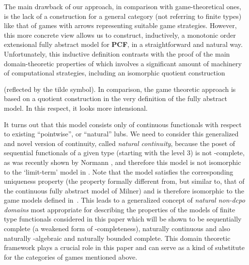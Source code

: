 \documentclass[fleqn]{LMCS}
\theoremstyle{plain}\newtheorem{satz}[thm]{Satz}
\theoremstyle{plain}\newtheorem{hyp}[thm]{Hypothesis}
\theoremstyle{plain}\newtheorem{hyps}[thm]{Hypotheses}
\theoremstyle{definition}\newtheorem{note}[thm]{Note}
\newcommand{\PCF}{\mbox{\bf PCF}}
\newcommand{\?}{\mbox{?}}
\begin{document}
The main drawback of our approach, in comparison with 
game-theoretical ones, 
is the lack of a construction 
for a general category (not referring to finite types) 
like that of games with arrows representing suitable game strategies. However, 
this more concrete view allows 
us to construct, inductively, 
a monotonic order extensional fully abstract model for \PCF,  
in a straightforward and natural way. 
Unfortunately, this inductive definition contrasts with the 
proof of the main domain-theoretic properties of  
which involves a significant amount of machinery 
of computational strategies, 
including an isomorphic quotient construction 
 
(reflected by the tilde symbol). 
In comparison, the game theoretic approach is based on a quotient 
construction in the very definition of the fully abstract model. 
In this respect, it looks 
more intensional. 


It turns out that this model consists only of continuous 
functionals with respect to existing ``pointwise'', or 
``natural'' lubs. We need to consider this generalized and novel version 
of continuity, called \emph{natural continuity}, because the poset of 
sequential functionals of a given type (starting with the level 3) is not 
-complete, 
as was recently shown by Normann \cite{Normann2004}, 
and therefore this model is not isomorphic 
to the `limit-term' model in \cite{Milner77}. 
Note that the model  
satisfies the corresponding uniqueness 
property 
(the property formally different from, but similar to, that of 
the continuous fully abstract model of Milner) 
and is therefore isomorphic to the game models 
defined in~\cite{Abramsky-Jagadeesan2000,Hyland-Ong2000}. 
This leads to a generalized concept of \emph{natural non-dcpo domains} 
most appropriate for describing the properties of the models 
of finite type functionals considered in this paper 
which will be shown to be  
sequentially complete 
(a weakened form of -completeness), 
naturally continuous 
and also 
naturally -algebraic and 
naturally bounded complete. This domain theoretic framework 
plays a crucial role in this paper and can serve as a kind of substitute for 
the categories of games mentioned above. 
\end{document}
